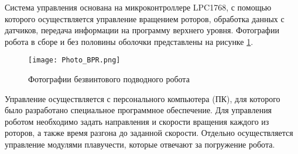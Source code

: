 Система управления основана на микроконтроллере LPC1768, с помощью которого осуществляется управление вращением роторов, обработка данных с датчиков, передача информации на программу верхнего уровня. Фотографии робота в сборе и без половины оболочки представлены на рисунке \ref{Photo_BPR}.

\begin{figure}[h]
	\centering
	\texttt{[image: Photo\_BPR.png]}%
	\caption{Фотографии безвинтового подводного робота}
	\label{Photo_BPR}
\end{figure}

Управление осуществляется с персонального компьютера (ПК), для которого было разработано специальное программное обеспечение. Для управления роботом необходимо задать направления и скорости вращения каждого из роторов, а также время разгона до заданной скорости. Отдельно осуществляется управление модулями плавучести, которые отвечают за погружение робота.



\clearpage